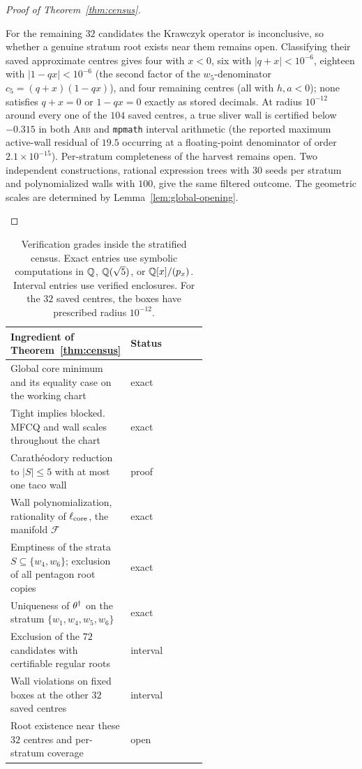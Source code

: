 \begin{proof}[Proof of Theorem~\textup{\ref{thm:census}}]
\begin{compres}\label{compres:residue}
For the remaining $32$ candidates the Krawczyk operator is inconclusive, so whether a genuine stratum root exists near them remains open. Classifying their saved approximate centres gives four with $x<0$, six with $|q+x|<10^{-6}$, eighteen with $|1-qx|<10^{-6}$ (the second factor of the $w_5$-denominator $c_5=(q+x)(1-qx)$), and four remaining centres (all with $h,a<0$); none satisfies $q+x=0$ or $1-qx=0$ exactly as stored decimals. At radius $10^{-12}$ around every one of the $104$ saved centres, a true sliver wall is certified below $-0.315$ in both \textsc{Arb} and \texttt{mpmath} interval arithmetic (the reported maximum active-wall residual of $19.5$ occurring at a floating-point denominator of order $2.1\times10^{-15}$). Per-stratum completeness of the harvest remains open. Two independent constructions, rational expression trees with $30$ seeds per stratum and polynomialized walls with $100$, give the same filtered outcome. The geometric scales are determined by Lemma~\ref{lem:global-opening}.
\end{compres}
\end{proof}

\begin{table}[t]
\centering\small
\begin{tabular}{@{}p{0.56\linewidth}l@{}}
\hline
Ingredient of Theorem~\ref{thm:census} & Status\\
\hline
\raggedright Global core minimum and its equality case on the working chart & exact\tabularnewline
\raggedright Tight implies blocked. MFCQ and wall scales throughout the chart & exact\tabularnewline
\raggedright Carath\'eodory reduction to $|S|\le5$ with at most one taco wall & proof\tabularnewline
\raggedright Wall polynomialization, rationality of $\ell_{\mathrm{core}}$, the manifold $\mathcal F$ & exact\tabularnewline
\raggedright Emptiness of the strata $S\subseteq\{w_4,w_6\}$; exclusion of all pentagon root copies & exact\tabularnewline
\raggedright Uniqueness of $\theta^\dagger$ on the stratum $\{w_1,w_4,w_5,w_6\}$ & exact\tabularnewline
\raggedright Exclusion of the $72$ candidates with certifiable regular roots & interval\tabularnewline
\raggedright Wall violations on fixed boxes at the other $32$ saved centres & interval\tabularnewline
\raggedright Root existence near these $32$ centres and per-stratum coverage & open\tabularnewline
\hline
\end{tabular}
\caption{Verification grades inside the stratified census. Exact entries use symbolic computations in $\mathbb{Q}$, $\mathbb{Q}(\sqrt5)$, or $\mathbb{Q}[x]/(p_x)$. Interval entries use verified enclosures. For the $32$ saved centres, the boxes have prescribed radius $10^{-12}$.}
\label{tab:census}
\end{table}

